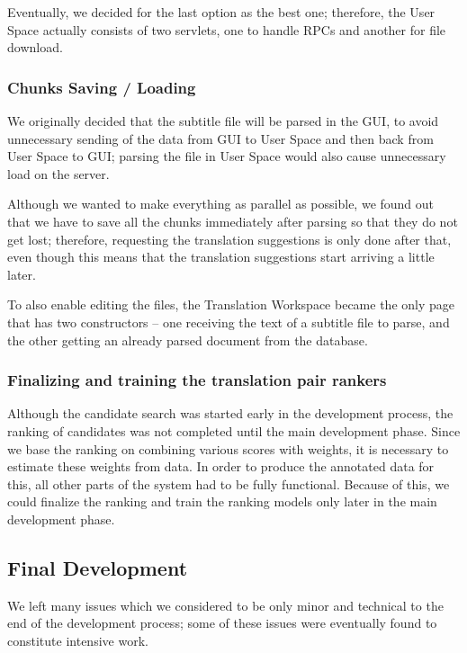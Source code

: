 {Eventually, we decided for the last option as the best one; therefore, the User Space actually consists of two servlets, one to handle RPCs and another for file download.

\subsubsection{Chunks Saving / Loading}

We originally decided that the subtitle file will be parsed in the GUI, 
to avoid unnecessary sending of the data from GUI to User Space and then back from User Space to GUI; parsing the file in User Space would also cause unnecessary load on the server.

Although we wanted to make everything as parallel as possible, we found out that we have to save all the chunks immediately after parsing so that they do not get lost; therefore, requesting the translation suggestions is only done after that, even though this means that the translation suggestions start arriving a little later.

To also enable editing the files, the Translation Workspace became the only page that has two constructors -- one receiving the text of a subtitle file to parse, and the other getting an already parsed document from the database.

\subsubsection{Finalizing and training the translation pair rankers}

Although the candidate search was started early in the development process, the ranking of candidates was not completed until the main development phase. Since we base the ranking on combining various scores with weights, it is necessary to estimate these weights from data. In order to produce the annotated data for this, all other parts of the system had to be fully functional. Because of this, we could finalize the ranking and train the ranking models only later in the main development phase.



\subsection{Final Development}
\label{subsec:final_development}

We left many issues which we considered to be only minor and technical
to the end of the development process;
some of these issues were eventually found to constitute intensive work.

}
